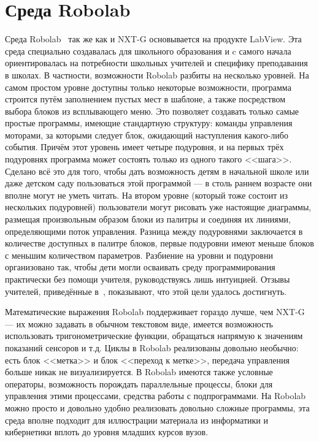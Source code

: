 \documentclass[a4paper]{article}
\begin{document}
\section{Среда Robolab}
Среда Robolab~\cite{robolab} так же как и NXT-G основывается на продукте LabView. Эта среда специально создавалась для школьного образования и c самого начала ориентировалась на потребности школьных учителей и специфику преподавания в школах. В частности, возможности Robolab разбиты на несколько уровней. На самом простом уровне доступны только некоторые возможности, программа строится путём заполнением пустых мест в шаблоне, а также посредством выбора блоков из всплывающего меню. Это позволяет создавать только самые простые программы, имеющие стандартную структуру: команды управления моторами, за которыми следует блок, ожидающий наступления какого-либо события. Причём этот уровень имеет четыре подуровня, и на первых трёх подуровнях программа может состоять только из одного такого <<шага>>. Сделано всё это для того, чтобы дать возможность детям в начальной школе или даже детском саду пользоваться этой программой --- в столь раннем возрасте они вполне могут не уметь читать. На втором уровне (который тоже состоит из нескольких подуровней) пользователи могут рисовать уже настоящие диаграммы, размещая произвольным образом блоки из палитры и соединяя их линиями, определяющими поток управления. Разница между подуровнями заключается в количестве доступных в палитре блоков, первые подуровни имеют меньше блоков с меньшим количеством параметров. Разбиение на уровни и подуровни организовано так, чтобы дети могли осваивать среду программирования практически без помощи учителя, руководствуясь лишь интуицией. Отзывы учителей, приведённые в~\cite{robolab}, показывают, что этой цели удалось достигнуть.

Математические выражения Robolab поддерживает гораздо лучше, чем NXT-G --- их можно задавать в обычном текстовом виде, имеется возможность использовать тригонометрические функции, обращаться напрямую к значениям показаний сенсоров и т.д. Циклы в Robolab реализованы довольно необычно: есть блок <<метка>> и блок <<переход к метке>>, передача управления больше никак не визуализируется. В Robolab имеются также условные операторы, возможность порождать параллельные процессы, блоки для управления этими процессами, средства работы с подпрограммами. На Robolab можно просто и довольно удобно реализовать довольно сложные программы, эта среда вполне подходит для иллюстрации материала из информатики и кибернетики вплоть до уровня младших курсов вузов.
\end{document}
